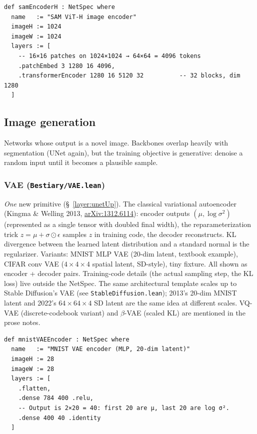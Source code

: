 \begin{verbatim}
def samEncoderH : NetSpec where
  name   := "SAM ViT-H image encoder"
  imageH := 1024
  imageW := 1024
  layers := [
    -- 16×16 patches on 1024×1024 → 64×64 = 4096 tokens
    .patchEmbed 3 1280 16 4096,
    .transformerEncoder 1280 16 5120 32          -- 32 blocks, dim 1280
  ]
\end{verbatim}

\subsection{Image generation}

Networks whose output is a novel image. Backbones overlap heavily with
segmentation (UNet again), but the training objective is generative:
denoise a random input until it becomes a plausible sample.

\subsubsection*{VAE (\texttt{Bestiary/VAE.lean})}
\emph{One} new primitive (\S~\ref{layer:unetUp}). The classical variational autoencoder
(Kingma \& Welling 2013, \href{https://arxiv.org/abs/1312.6114}{arXiv:1312.6114}): encoder outputs
$(\mu, \log \sigma^2)$ (represented as a single tensor with doubled
final width), the reparameterization trick
$z = \mu + \sigma \odot \epsilon$ samples $z$ in training code, the
decoder reconstructs. KL divergence between the learned latent
distribution and a standard normal is the regularizer. Variants:
MNIST MLP VAE (20-dim latent, textbook example), CIFAR conv VAE
($4 \times 4 \times 4$ spatial latent, SD-style), tiny fixture. All
shown as encoder + decoder pairs. Training-code details (the actual
sampling step, the KL loss) live outside the NetSpec. The same
architectural template scales up to Stable Diffusion's VAE (see
\texttt{StableDiffusion.lean}); 2013's 20-dim MNIST latent and
2022's $64 \times 64 \times 4$ SD latent are the same idea at
different scales. VQ-VAE (discrete-codebook variant) and $\beta$-VAE
(scaled KL) are mentioned in the prose notes.

\begin{verbatim}
def mnistVAEEncoder : NetSpec where
  name   := "MNIST VAE encoder (MLP, 20-dim latent)"
  imageH := 28
  imageW := 28
  layers := [
    .flatten,
    .dense 784 400 .relu,
    -- Output is 2×20 = 40: first 20 are μ, last 20 are log σ².
    .dense 400 40 .identity
  ]
\end{verbatim}

